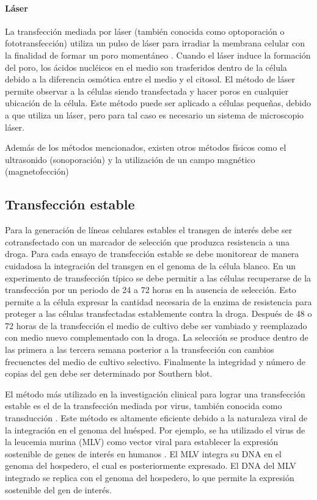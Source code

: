 \documentclass[fleqn,10pt]{SelfArx} %
\begin{document}
\paragraph*{Láser}
La transfección mediada por láser (también conocida como optoporación o fototransfección) utiliza un pulso de láser para irradiar la membrana celular con la finalidad de formar un poro momentáneo \cite{Shirahata:2001aa, Barrett:2006aa}. Cuando el láser induce la formación del poro, los ácidos nucléicos en el medio son trasferidos dentro de la célula debido a la diferencia osmótica entre el medio y el citosol. El método de láser permite observar a la células siendo transfectada y hacer poros en cualquier ubicación de la célula. Este método puede ser aplicado a células pequeñas, debido a que utiliza un láser, pero para tal caso es necesario un sistema de microscopio láser. 

Además de los métodos mencionados, existen otros métodos físicos como el ultrasonido (sonoporación) y la utilización de un campo magnético (magnetofección) \cite{Kim:1996aa, Dobson:2006aa, Scherer:2002aa}

\subsection{Transfección estable}
Para la generación de líneas celulares estables el transgen de interés debe ser cotransfectado con un marcador de selección que produzca resistencia a una droga. Para cada ensayo de transfección estable se debe monitorear de manera cuidadosa la integración del transgen en el genoma de la célula blanco. En un experimento de transfección típico se debe permitir a las células recuperarse de la transfección por un periodo de 24 a 72 horas en la ausencia de selección. Esto permite a la célula expresar la cantidad necesaria de la enzima de resistencia para proteger a las células transfectadas establemente contra la droga. Después de 48 o 72 horas de la transfección el medio de cultivo debe ser vambiado y reemplazado con medio nuevo complementado con la droga. La selección se produce dentro de las primera a las tercera semana posterior a la transfección con cambios frecuenctes del medio de cultivo selectivo. Finalmente la integridad y número de copias del gen debe ser determinado por Southern blot. 

El método más utilizado en la investigación clinical para lograr una transfección estable es el de la transfección mediada por virus, también conocida como transducción \cite{Pfeifer:2001aa}. Este método es altamente eficiente debido a la naturaleza viral de la integración en el genoma del huésped. Por ejemplo, se ha utilizado el virus de la leucemia murina (MLV)  como vector viral para establecer la expresión sostenible de genes de interés en humanos \cite{Hacein-Bey-Abina:2002aa, Roesler:2002aa}. El MLV integra su DNA en el genoma del hospedero, el cual es posteriormente expresado. El DNA del MLV integrado se replica con el genoma del hospedero, lo que permite la expresión sostenible del gen de interés.
\end{document}
